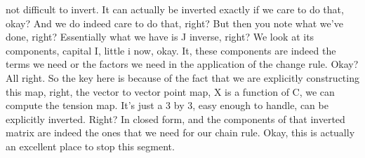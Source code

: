 \documentclass[10pt]{article}
\begin{document}
not difficult to invert. It can actually be inverted exactly if we care to do that, okay? And we do indeed care to do that, right? But then you note what we've done, right? Essentially what we have is J inverse, right? We look at its components, capital I, little i now, okay. It, these components are indeed the terms we need or the factors we need in the application of the change rule. Okay? All right. So the key here is because of the fact that we are explicitly constructing this map, right, the vector to vector point map, X is a function of C, we can compute the tension map. It's just a 3 by 3, easy enough to handle, can be explicitly inverted. Right? In closed form, and the components of that inverted matrix are indeed the ones that we need for our chain rule. Okay, this is actually an excellent place to stop this segment.
\end{document}
